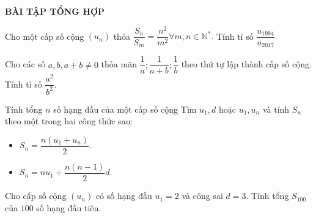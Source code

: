 \begin{center}
	\textbf{BÀI TẬP TỔNG HỢP}
\end{center}
\begin{bt}%
	Cho một cấp số cộng $(u_n)$ thỏa $\dfrac{S_n}{S_m}=\dfrac{n^2}{m^2} \forall m,n \in \mathbb{N^*}.$ Tính tỉ số $\dfrac{u_{1994}}{u_{2017}}.$
\end{bt}

\begin{bt}%
	Cho các số $a,b,a+b \neq 0$ thỏa mãn $\dfrac{1}{a};\dfrac{1}{a+b};\dfrac{1}{b}$ theo thứ tự lập thành cấp số cộng. Tính tỉ số $\dfrac{a^2}{b^2}.$
\end{bt}

\begin{dang}{Tính tổng $n$ số hạng đầu của một cấp số cộng}
	Tìm $u_1, d$ hoặc $u_1, u_n$ và tính $S_n$ theo một trong hai công thức sau:
	\begin{itemize}
		\item $S_n=\dfrac{n(u_1+u_n)}{2}$.
		\item $S_n=nu_1+\dfrac{n(n-1)}{2}d$. 
	\end{itemize}
\end{dang}

\begin{vd}%
	Cho cấp số cộng $(u_n)$ có số hạng đầu $u_1=2$ và công sai $d=3$. Tính tổng $S_{100}$ của $100$ số hạng đầu tiên. 
\end{vd}

